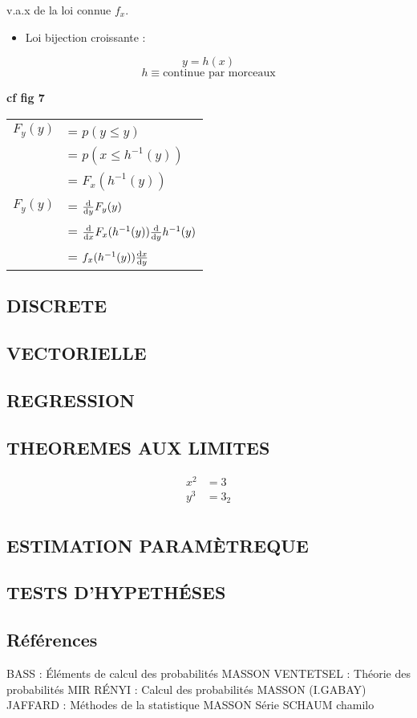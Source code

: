 \documentclass[]{article}
\begin{document}
v.a.x de la loi connue $f_x$.

\begin{itemize}
\itemsep1pt\parskip0pt
\item
  Loi bijection croissante :
\end{itemize}

\[y = h(x)\] \[h \equiv \text{continue par morceaux}\]

\textbf{cf fig 7}

\begin{tabular}{r l}
$F_y(y)$ &= $p(y \leq y)$ \\
&= $p(x \leq h^{-1}(y))$ \\
&= $F_x(h^{-1}(y))$ \\
$F_y(y)$ &= $\frac{\mathrm{d} }{\mathrm{d}y} F_y(y)$ \\
&= $\frac{\mathrm{d} }{\mathrm{d}x} F_x(h^{-1}(y)) \frac{\mathrm{d} }{\mathrm{d}y}h^{-1}(y)$ \\
&= $f_x(h^{-1}(y))\frac{\mathrm{d} x}{\mathrm{d}y}$ \\
\end{tabular}

\subsection{DISCRETE}

\subsection{VECTORIELLE}

\subsection{REGRESSION}

\subsection{THEOREMES AUX LIMITES}
\begin{align*}
x^2 &=3\\
y^3 &= 3_2\\
\end{align*}
\subsection{ESTIMATION PARAMÈTREQUE}

\subsection{TESTS D'HYPETHÉSES}

\subsection{Références}

BASS : Éléments de calcul des probabilités MASSON VENTETSEL : Théorie
des probabilités MIR RÉNYI : Calcul des probabilités MASSON (I.GABAY)
JAFFARD : Méthodes de la statistique MASSON Série SCHAUM chamilo
\end{document}

